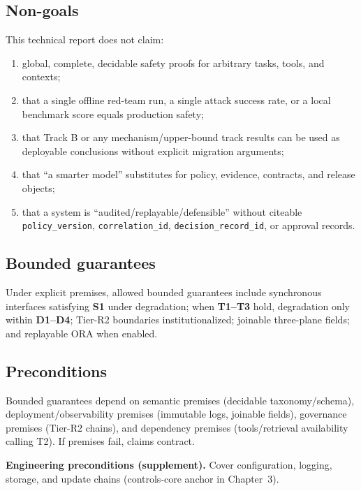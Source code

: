 \documentclass[11pt,a4paper]{report}
\begin{document}
\subsection{Non-goals}
This technical report does not claim:
\begin{enumerate}
  \item global, complete, decidable safety proofs for arbitrary tasks, tools, and contexts;
  \item that a single offline red-team run, a single attack success rate, or a local benchmark score equals production safety;
  \item that Track B or any mechanism/upper-bound track results can be used as deployable conclusions without explicit migration arguments;
  \item that ``a smarter model'' substitutes for policy, evidence, contracts, and release objects;
  \item that a system is ``audited/replayable/defensible'' without citeable \texttt{policy\_version}, \texttt{correlation\_id}, \texttt{decision\_record\_id}, or approval records.
\end{enumerate}

\subsection{Bounded guarantees}
Under explicit premises, allowed bounded guarantees include synchronous interfaces satisfying \textbf{S1} under degradation; when \textbf{T1--T3} hold, degradation only within \textbf{D1--D4}; Tier-R2 boundaries institutionalized; joinable three-plane fields; and replayable ORA when enabled.

\subsection{Preconditions}
Bounded guarantees depend on semantic premises (decidable taxonomy/schema), deployment/observability premises (immutable logs, joinable fields), governance premises (Tier-R2 chains), and dependency premises (tools/retrieval availability calling T2). If premises fail, claims contract.

\noindent\textbf{Engineering preconditions (supplement).} Cover configuration, logging, storage, and update chains (controls-core anchor in Chapter~3).
\end{document}
